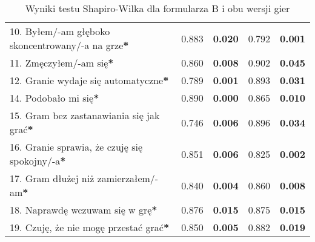 \begin{table}[h!]
\begin{center}
\begin{tabular}{|m{10em}|m{5em}|m{5em}|m{5em}|m{5em}|}
            10. Byłem/-am głęboko \newline skoncentrowany/-a \newline na grze\textbf{*} & 0.883                       & \textbf{0.020}   & 0.792                   & \textbf{0.001} \\
            11. Zmęczyłem/-am się\textbf{*}                                             & 0.860                       & \textbf{0.008}   & 0.902                   & \textbf{0.045} \\
            12. Granie wydaje się automatyczne\textbf{*}                                & 0.789                       & \textbf{0.001}   & 0.893                   & \textbf{0.031} \\
            14. Podobało mi się\textbf{*}                                               & 0.890                       & \textbf{0.000}   & 0.865                   & \textbf{0.010} \\
            15. Gram bez zastanawiania się jak grać\textbf{*}                           & 0.746                       & \textbf{0.006}   & 0.896                   & \textbf{0.034} \\
            16. Granie sprawia, \newline że czuję się spokojny/-a\textbf{*}             & 0.851                       & \textbf{0.006}   & 0.825                   & \textbf{0.002} \\
            17. Gram dłużej \newline niż zamierzałem/-am\textbf{*}                      & 0.840                       & \textbf{0.004}   & 0.860                   & \textbf{0.008} \\
            18. Naprawdę wczuwam się w grę\textbf{*}                                    & 0.876                       & \textbf{0.015}   & 0.875                   & \textbf{0.015} \\
            19. Czuję, że nie mogę przestać grać\textbf{*}                              & 0.850                       & \textbf{0.005}   & 0.882                   & \textbf{0.019} \\
            \hline
        \end{tabular}
    \end{center}
    \caption{Wyniki testu Shapiro-Wilka dla formularza B i obu wersji gier}\label{tab1:ch7_11}
\end{table}

